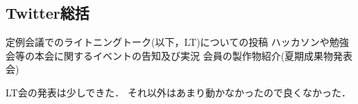 \subsection*{Twitter総括}

定例会議でのライトニングトーク(以下，LT)についての投稿
ハッカソンや勉強会等の本会に関するイベントの告知及び実況
会員の製作物紹介(夏期成果物発表会) 

LT会の発表は少しできた．
それ以外はあまり動かなかったので良くなかった．
